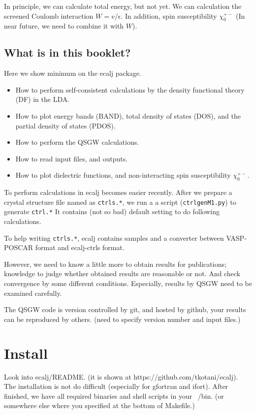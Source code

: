 \documentclass[a4paper,10pt,epsf,fleqn]{article}
\begin{document}
In principle, we can calculate total energy, but not yet.
We can calculation the screened Coulomb interaction $W=v/\epsilon$.
In addition, spin susceptibility $\chi_0^{+-}$
(In near future, we need to combine it with $W$).


\subsection{What is in this booklet?}
Here we show minimum on the ecalj package.
\begin{itemize}
\item
How to perform self-consistent calculations by the density functional
theory (DF) in the LDA. 
\item
How to plot energy bands (BAND), total density of states
(DOS), and the partial density of states (PDOS).
\item
How to perform the QSGW calculations.
\item
How to read input files, and outputs.
\item
How to plot dielectric functions, and non-interacting spin
     susceptibility $\chi_0^{+-}$.
\end{itemize}

To perform calculations in ecalj becomes easier recently.
After we prepare a crystal structure file named as \verb+ctrls.*+,
we run a a script (\verb+ctrlgenM1.py+) to generate \verb+ctrl.*+
It contains (not so bad) default setting to do following calculations.

To help writing \verb+ctrls.*+, ecalj contains samples 
and a converter between VASP-POSCAR format 
and ecalj-ctrls format. 

However, we need to know a little more to obtain results for publications;
knowledge to judge whether obtained results are reasonable or not. 
And check convergence by some different conditions.
Especially, results by QSGW need to be examined carefully. 

The QSGW code is version controlled by git, 
and hosted by github, your results can be reproduced by others.
(need to specify version number and input files.)


\section{Install}
\label{install}
Look into ecalj/README. (it is shown at https://github.com/tkotani/ecalj).
The installation is not do difficult (especially for gfortran and ifort). 
After finished, we have all required binaries and shell scripts in your
~/bin. (or somewhere else where you specified at the bottom of Makefile.)
\end{document}
